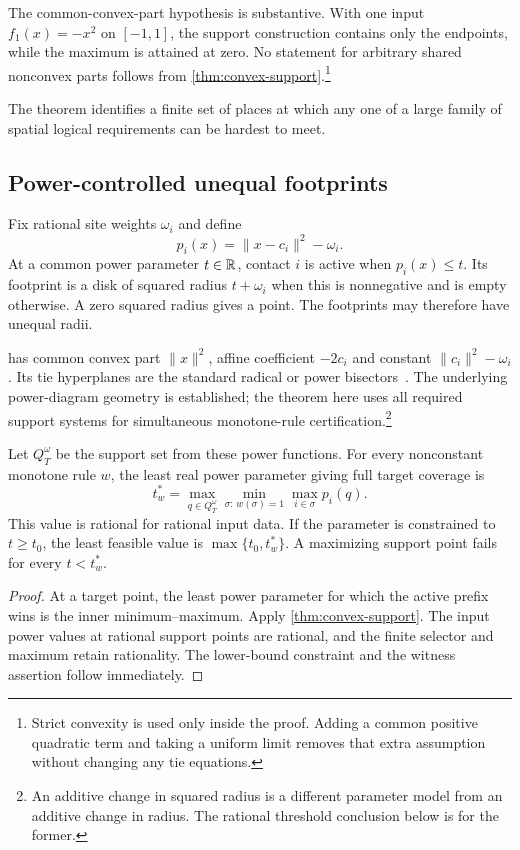 \begin{remark}
The common-convex-part hypothesis is substantive. With one input $f_1(x)=-x^2$ on $[-1,1]$, the support construction contains only the endpoints, while the maximum is attained at zero. No statement for arbitrary shared nonconvex parts follows from \cref{thm:convex-support}.\footnote{Strict convexity is used only inside the proof. Adding a common positive quadratic term and taking a uniform limit removes that extra assumption without changing any tie equations.}
\end{remark}

The theorem identifies a finite set of places at which any one of a large family of spatial logical requirements can be hardest to meet.

\subsection{Power-controlled unequal footprints}
Fix rational site weights $\omega_i$ and define
\begin{equation}\label{eq:power}
p_i(x)=\|x-c_i\|^2-\omega_i.
\end{equation}
At a common power parameter $t\in\mathbb R$, contact $i$ is active when $p_i(x)\le t$. Its footprint is a disk of squared radius $t+\omega_i$ when this is nonnegative and is empty otherwise. A zero squared radius gives a point. The footprints may therefore have unequal radii.

 has common convex part $\|x\|^2$, affine coefficient $-2c_i$ and constant $\|c_i\|^2-\omega_i$. Its tie hyperplanes are the standard radical or power bisectors~\cite{aurenhammer}. The underlying power-diagram geometry is established; the theorem here uses all required support systems for simultaneous monotone-rule certification.\footnote{An additive change in squared radius is a different parameter model from an additive change in radius. The rational threshold conclusion below is for the former.}

\begin{corollary}\label{cor:power-threshold}
Let $Q_T^\omega$ be the support set from these power functions. For every nonconstant monotone rule $w$, the least real power parameter giving full target coverage is
\begin{equation}\label{eq:power-threshold}
t_w^*=\max_{q\in Q_T^\omega}\min_{\sigma:\,w(\sigma)=1}\max_{i\in\sigma}p_i(q).
\end{equation}
This value is rational for rational input data. If the parameter is constrained to $t\ge t_0$, the least feasible value is $\max\{t_0,t_w^*\}$. A maximizing support point fails for every $t<t_w^*$.
\end{corollary}
\begin{proof}
At a target point, the least power parameter for which the active prefix wins is the inner minimum--maximum. Apply \cref{thm:convex-support}. The input power values at rational support points are rational, and the finite selector and maximum retain rationality. The lower-bound constraint and the witness assertion follow immediately.
\end{proof}

